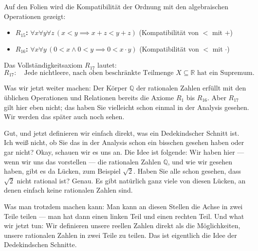 \begin{meta-note}
Auf den Folien wird die Kompatibilität der Ordnung mit den algebraischen Operationen gezeigt:
\begin{itemize}
    \item \textbf{$R_{15}$:} $\forall x \forall y \forall z \, (x < y \implies x + z < y + z)$ (Kompatibilität von $<$ mit $+$)
    \item \textbf{$R_{16}$:} $\forall x \forall y \, (0 < x \wedge 0 < y \implies 0 < x \cdot y)$ (Kompatibilität von $<$ mit $\cdot$)
\end{itemize}
\end{meta-note}

\begin{math-stroke}
Das Vollständigkeitsaxiom $R_{17}$ lautet:
\begin{equation}
\label{eq:vollstaendigkeit_axiom}
R_{17}\colon \quad \text{Jede nichtleere, nach oben beschränkte Teilmenge } X \subseteq \mathbb{R} \text{ hat ein Supremum.}
\end{equation}
\end{math-stroke}

\begin{spoken-clean}[00:17:40 - 00:20:15]
Was wir jetzt weiter machen: Der Körper $\mathbb{Q}$ der rationalen Zahlen erfüllt mit den üblichen Operationen und Relationen bereits die Axiome $R_1$ bis $R_{16}$. Aber $R_{17}$ gilt hier eben nicht; das haben Sie vielleicht schon einmal in der Analysis gesehen. Wir werden das später auch noch sehen.

Gut, und jetzt definieren wir einfach direkt, was ein Dedekindscher Schnitt ist. Ich weiß nicht, ob Sie das in der Analysis schon ein bisschen gesehen haben oder gar nicht? Okay, schauen wir es uns an. Die Idee ist folgende: Wir haben hier --- wenn wir uns das vorstellen --- die rationalen Zahlen $\mathbb{Q}$, und wie wir gesehen haben, gibt es da Lücken, zum Beispiel $\sqrt{2}$. Haben Sie alle schon gesehen, dass $\sqrt{2}$ nicht rational ist? Genau. Es gibt natürlich ganz viele von diesen Lücken, an denen einfach keine rationalen Zahlen sind.

Was man trotzdem machen kann: Man kann an diesen Stellen die Achse in zwei Teile teilen --- man hat dann einen linken Teil und einen rechten Teil. Und what wir jetzt tun: Wir definieren unsere reellen Zahlen direkt als die Möglichkeiten, unsere rationalen Zahlen in zwei Teile zu teilen. Das ist eigentlich die Idee der Dedekindschen Schnitte.
\end{spoken-clean}

